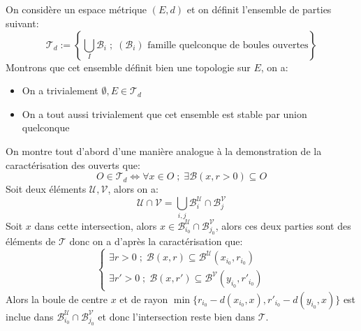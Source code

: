 \documentclass{report}
\begin{document}
      \subsection*{}
         On considère un espace métrique $(E, d)$ et on définit l'ensemble de parties suivant:
            $$
               \mathcal{T}_d := \left\{ \bigcup_I \mathcal{B}_i \; ; \; (\mathcal{B}_i) \text{ famille quelconque de boules ouvertes}\right\}
            $$
            Montrons que cet ensemble définit bien une topologie sur $E$, on a:
            \begin{itemize}
               \item On a trivialement $\emptyset, E \in \mathcal{T}_d$
               \item On a tout aussi trivialement que cet ensemble est stable par union quelconque
            \end{itemize}
            On montre tout d'abord d'une manière analogue à la demonstration de la caractérisation des ouverts que:
            \[
               O \in \mathcal{T}_d \Longleftrightarrow \forall x \in O \; ; \; \exists \mathcal{B}(x, r > 0) \subseteq O
            \]
            Soit deux éléments $\mathcal{U}, \mathcal{V}$, alors on a:
            $$
               \mathcal{U} \cap \mathcal{V} = \bigcup_{i, j} \mathcal{B}^\mathcal{U}_i \cap \mathcal{B}^\mathcal{V}_j
            $$
            Soit $x$ dans cette intersection, alors $x \in \mathcal{B}^\mathcal{U}_{i_0}\cap \mathcal{B}^\mathcal{V}_{j_0}$, alors ces deux parties sont des éléments de \(\mathcal{T}\) donc on a d'après la caractérisation que:
            $$
               \begin{cases}
                     \exists r > 0 \; ; \; \mathcal{B}(x, r) \subseteq \mathcal{B}^\mathcal{U}(x_{i_0}, r_{i_0})\\
                     \exists r' > 0 \; ; \; \mathcal{B}(x, r')\subseteq \mathcal{B}^\mathcal{V}(y_{i_0}, r'_{i_0})
               \end{cases}
            $$
            Alors la boule de centre \(x\) et de rayon \(\min\{r_{i_0} - d(x_{i_0}, x), r'_{i_0} - d(y_{i_0}, x)\}\) est inclue dans \(\mathcal{B}^\mathcal{U}_{i_0}\cap \mathcal{B}^\mathcal{V}_{j_0}\) et donc l'intersection reste bien dans \(\mathcal{T}\).
\end{document}
